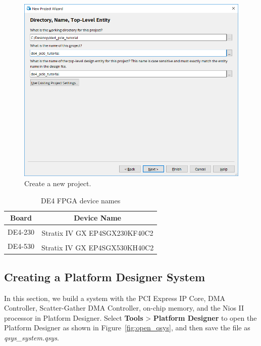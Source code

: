 \documentclass[11pt, twoside, pdftex]{article}
\begin{document}
\begin{figure}[H]
	\centering
	  \includegraphics[scale=0.65]{figures/create_project.png}
	\caption{Create a new project.} 
	\label{fig:create_project}
\end{figure}

\begin{table}[H]
	\centering
	\caption{DE4 FPGA device names}
	\begin{tabular}{| c | c |}
		\hline
		Board & Device Name \\
		\hline
		DE4-230 & Stratix\textsuperscript{\textregistered} IV GX EP4SGX230KF40C2 \\
		\hline
		DE4-530 & Stratix\textsuperscript{\textregistered} IV GX EP4SGX530KH40C2 \\
		\hline
	\end{tabular}
	\label{tab:device}
\end{table}

\subsection{Creating a Platform Designer System}
In this section, we build a system with the PCI Express IP Core, DMA Controller, Scatter-Gather DMA Controller, on-chip memory, and the Nios II processor in Platform Designer. Select {\bf Tools} > {\bf Platform Designer} to open the Platform Designer as shown in Figure~\ref{fig:open_qsys}, and then save the file as {\it qsys\_system.qsys}. 
\end{document}
